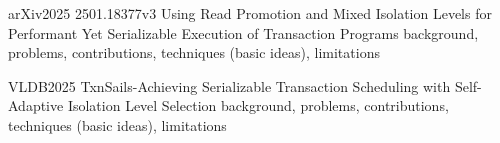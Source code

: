\begin{frame}{arXiv2025 2501.18377v3 Using Read Promotion and Mixed Isolation Levels for Performant Yet Serializable Execution of Transaction Programs}
	background, problems, contributions, techniques (basic ideas), limitations
\end{frame}

\begin{frame}{VLDB2025 TxnSails-Achieving Serializable Transaction Scheduling with Self-Adaptive Isolation Level Selection}
	background, problems, contributions, techniques (basic ideas), limitations
\end{frame}
